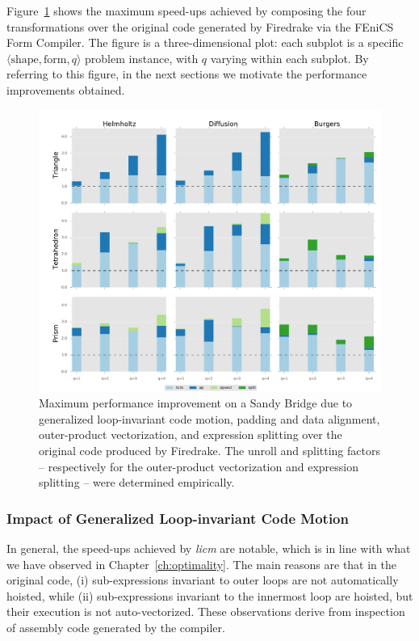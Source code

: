 Figure~\ref{fig:coffee-individual-res} shows the maximum speed-ups achieved by composing the four transformations over the original code generated by Firedrake via the FEniCS Form Compiler. The figure is a three-dimensional plot: each subplot is a specific ${\langle} \textrm{shape}, \mathrm{form}, q {\rangle}$ problem instance, with $q$ varying within each subplot. By referring to this figure, in the next sections we motivate the performance improvements obtained.

\begin{figure}[t]
\centerline{\includegraphics[scale=0.45]{lowlevelopt/perf-results/individual/plot_sb}}
\caption{Maximum performance improvement on a Sandy Bridge due to generalized loop-invariant code motion, padding and data alignment, outer-product vectorization, and expression splitting over the original code produced by Firedrake. The unroll and splitting factors -- respectively for the outer-product vectorization and expression splitting -- were determined empirically.}
\label{fig:coffee-individual-res}
\end{figure}


\subsubsection{Impact of Generalized Loop-invariant Code Motion}
\label{sec:perf-eval-licm}

In general, the speed-ups achieved by \emph{licm} are notable, which is in line with what we have observed in Chapter~\ref{ch:optimality}. The main reasons are that in the original code, (i) sub-expressions invariant to outer loops are not automatically hoisted, while (ii) sub-expressions invariant to the innermost loop are hoisted, but their execution is not auto-vectorized. These observations derive from inspection of assembly code generated by the compiler. 

